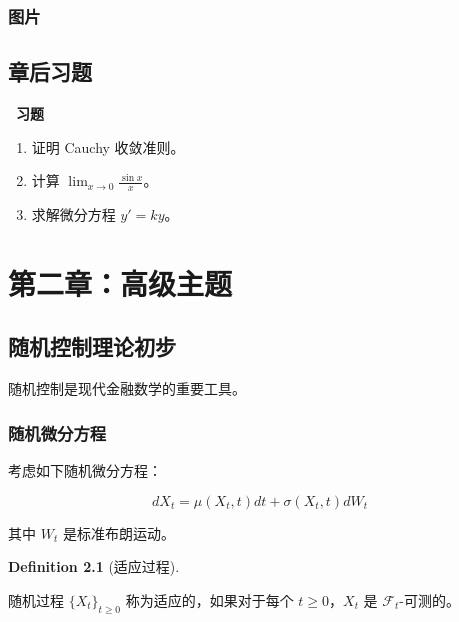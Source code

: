 \documentclass[
  11pt,
  letterpaper,
  oneside,
  a4paper]{book}
\makeatletter
\providecommand{\tightlist}{%
  \setlength{\itemsep}{0pt}\setlength{\parskip}{0pt}}
\newcounter{problem}[chapter]
\newenvironment{problemset}[1][习题]{
  \vspace*{10pt}
  \begin{center}
    \textcolor{structurecolor}{\Large\bfseries\adftripleflourishleft~#1~\adftripleflourishright}
  \end{center}}{
  \par}
\numberwithin{equation}{chapter}
\def\cleardoublepage{\clearpage\ifodd\c@page\else
    \hbox{}\thispagestyle{empty}\newpage\fi}
\let\oldchapter\chapter
\renewcommand{\chapter}{%
    \cleardoublepage
    \oldchapter
  }%
\theoremstyle{plain}
\theoremstyle{definition}
\newtheorem{definition}{Definition}[chapter]
\theoremstyle{plain}
\theoremstyle{plain}
\theoremstyle{plain}
\theoremstyle{remark}
\makeatother
\begin{document}
\subsection{图片}\label{ux56feux7247}

\section{章后习题}\label{ux7ae0ux540eux4e60ux9898}

\begin{problemset}

\begin{enumerate}
\def\labelenumi{\arabic{enumi}.}
\tightlist
\item
  证明 Cauchy 收敛准则。
\item
  计算 \(\lim_{x \to 0} \frac{\sin x}{x}\)。
\item
  求解微分方程 \(y' = ky\)。
\end{enumerate}

\end{problemset}


\chapter{第二章：高级主题}\label{ux7b2cux4e8cux7ae0ux9ad8ux7ea7ux4e3bux9898}

\section{随机控制理论初步}\label{ux968fux673aux63a7ux5236ux7406ux8bbaux521dux6b65}

随机控制是现代金融数学的重要工具。

\subsection{随机微分方程}\label{ux968fux673aux5faeux5206ux65b9ux7a0b}

考虑如下随机微分方程：

\begin{equation} dX_t = \mu(X_t, t) dt + \sigma(X_t, t) dW_t \end{equation}

其中 \(W_t\) 是标准布朗运动。

\begin{definition}[适应过程]\protect\hypertarget{def-adapted}{}\label{def-adapted}

随机过程 \(\{X_t\}_{t \geq 0}\) 称为适应的，如果对于每个
\(t \geq 0\)，\(X_t\) 是 \(\mathcal{F}_t\)-可测的。

\end{definition}
\end{document}
